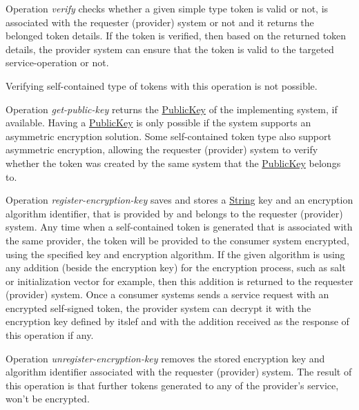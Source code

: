 \documentclass[a4paper]{arrowhead}
\newcommand{\pref}[1]{{\textcolor{ArrowheadGrey}{\hyperref[sec:model:primitives:#1]{#1}}}}
\begin{document}

Operation \textit{verify} checks whether a given simple type token is valid or not, is associated with the requester (provider) system or not and it returns the belonged token details. If the token is verified, then based on the returned token details, the provider system can ensure that the token is valid to the targeted service-operation or not.

Verifying self-contained type of tokens with this operation is not possible.


Operation \textit{get-public-key} returns the \pref{PublicKey} of the implementing system, if available. Having a \pref{PublicKey} is only possible if the system supports an asymmetric encryption solution. Some self-contained token type also support asymmetric encryption, allowing the requester (provider) system to verify whether the token was created by the same system that the \pref{PublicKey} belongs to.


Operation \textit{register-encryption-key} saves and stores a \pref{String} key and an encryption algorithm identifier, that is provided by and belongs to the requester (provider) system. Any time when a self-contained token is generated that is associated with the same provider, the token will be provided to the consumer system encrypted, using the specified key and encryption algorithm. If the given algorithm is using any addition (beside the encryption key) for the encryption process, such as salt or initialization vector for example, then this addition is returned to the requester (provider) system. Once a consumer systems sends a service request with an encrypted self-signed token, the provider system can decrypt it with the encryption key defined by itslef and with the addition received as the response of this operation if any.


Operation \textit{unregister-encryption-key} removes the stored encryption key and algorithm identifier associated with the requester (provider) system. The result of this operation is that further tokens generated to any of the provider's service, won't be encrypted. 
\end{document}
